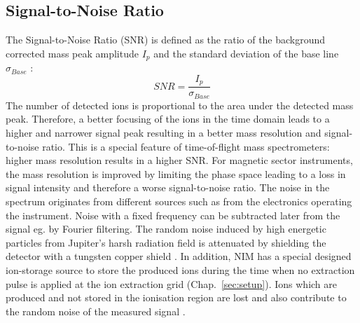 	\subsection{Signal-to-Noise Ratio}
	The Signal-to-Noise Ratio (SNR) is defined as the ratio of the background corrected mass peak amplitude $I_{p}$ and the standard deviation of the base line $\sigma_{Base}$ \cite{Agilent_TechNote_SNR,Master_Meyer}: %
	\begin{equation}
		SNR = \frac{I_{p}}{\sigma_{Base}}
		\label{eq:SNR}
	\end{equation}
	The number of detected ions is proportional to the area under the detected mass peak. Therefore, a better focusing of the ions in the time domain leads to a higher and narrower signal peak resulting in a better mass resolution and signal-to-noise ratio. This is a special feature of time-of-flight mass spectrometers: higher mass resolution results in a higher SNR. For magnetic sector instruments, the mass resolution is improved by limiting the phase space leading to a loss in signal intensity and therefore a worse signal-to-noise ratio. The noise in the spectrum originates from different sources such as from the electronics operating the instrument. Noise with a fixed frequency can be subtracted later from the signal eg. by Fourier filtering. The random noise induced by high energetic particles from Jupiter's harsh radiation field is attenuated by shielding the detector with a tungsten copper shield \cite{Foehn2021}. In addition, NIM has a special designed ion-storage source to store the produced ions during the time when no extraction pulse is applied at the ion extraction grid (Chap.~\ref{sec:setup}). Ions which are produced and not stored in the ionisation region are lost and also contribute to the random noise of the measured signal \cite{Diss_Abplanalp}. 

